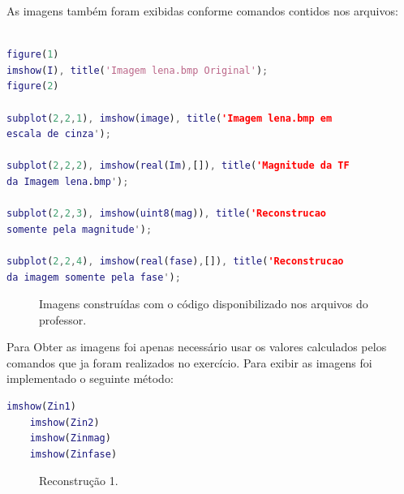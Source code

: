 \documentclass{article}[a4paper,12pt,twoside]
\begin{document}
\vspace{0.4cm}
As imagens também foram exibidas conforme comandos contidos nos arquivos:

\begin{lstlisting}[language = Matlab]

figure(1)
imshow(I), title('Imagem lena.bmp Original');
figure(2)

subplot(2,2,1), imshow(image), title('Imagem lena.bmp em 
escala de cinza');

subplot(2,2,2), imshow(real(Im),[]), title('Magnitude da TF
da Imagem lena.bmp');

subplot(2,2,3), imshow(uint8(mag)), title('Reconstrucao
somente pela magnitude');

subplot(2,2,4), imshow(real(fase),[]), title('Reconstrucao
da imagem somente pela fase');
\end{lstlisting}

\begin{figure}[H]
    \centering
    \caption{Imagens construídas com o código disponibilizado nos arquivos do professor.}
    \label{fig:my_label}
\end{figure}

\vspace{0.5cm}
Para Obter as imagens foi apenas necessário usar os valores calculados pelos comandos que ja foram realizados no exercício. Para exibir as imagens foi implementado o seguinte método:

\begin{lstlisting}[language=Matlab]
    imshow(Zin1)
    imshow(Zin2)
    imshow(Zinmag)
    imshow(Zinfase)
\end{lstlisting}

\newpage

\begin{figure}[H]
    \centering
    \caption{Reconstrução 1.}
    \label{fig:my_label}
\end{figure}
\end{document}
